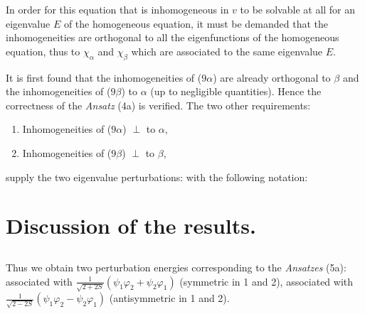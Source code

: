 \begin{paper}{1}
In order for this equation that is inhomogeneous in $v$ to be solvable at all for an eigenvalue $E$ of the homogeneous equation, it must be demanded that the inhomogeneities are orthogonal to all the eigenfunctions of the homogeneous equation, thus to $\chi_\alpha$ and $\chi_\beta$ which are associated to the same eigenvalue $E$.

It is first found that the inhomogeneities of ($9\alpha$) are already orthogonal to $\beta$ and the inhomogeneities of ($9\beta$) to $\alpha$ (up to negligible quantities). Hence the correctness of the \textit{Ansatz} (4a) is verified. The two other requirements:
\begin{enumerate}
	\item Inhomogeneities of ($9\alpha$) $\perp$ to $\alpha$,
	\item Inhomogeneities of ($9\beta$) $\perp$ to $\beta$,
\end{enumerate}
supply the two eigenvalue perturbations:
with the following notation:

\section{Discussion of the results.}
\subsection{} Thus we obtain two perturbation energies corresponding to the \textit{Ansatzes} (5a):
associated with $\frac{1}{\sqrt{2+2S}}(\psi_1\varphi_2+\psi_2\varphi_1)$ (symmetric in 1 and 2),
associated with $\frac{1}{\sqrt{2-2S}}(\psi_1\varphi_2-\psi_2\varphi_1)$ (antisymmetric in 1 and 2).


\end{paper}
